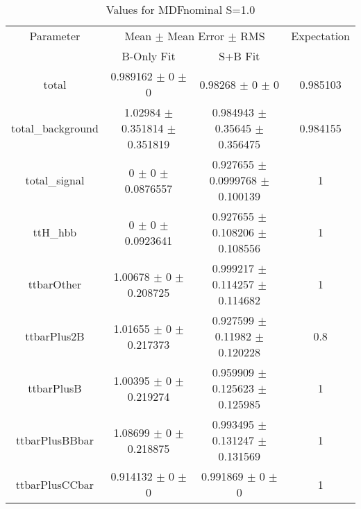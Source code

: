 \begin{table}
\centering
\caption{Values for MDFnominal S=1.0}
\begin{tabular}{cccc}
\toprule
Parameter & \multicolumn{2}{c}{Mean $\pm$ Mean Error $\pm$ RMS} & Expectation\\
 & B-Only Fit & S+B Fit & \\
\midrule
total & \num{0.989162} $\pm$ \num{0} $\pm$ \num{0} & \num{0.98268} $\pm$ \num{0} $\pm$ \num{0} & \num{0.985103}\\
total\_background & \num{1.02984} $\pm$ \num{0.351814} $\pm$ \num{0.351819} & \num{0.984943} $\pm$ \num{0.35645} $\pm$ \num{0.356475} & \num{0.984155}\\
total\_signal & \num{0} $\pm$ \num{0} $\pm$ \num{0.0876557} & \num{0.927655} $\pm$ \num{0.0999768} $\pm$ \num{0.100139} & \num{1}\\
ttH\_hbb & \num{0} $\pm$ \num{0} $\pm$ \num{0.0923641} & \num{0.927655} $\pm$ \num{0.108206} $\pm$ \num{0.108556} & \num{1}\\
ttbarOther & \num{1.00678} $\pm$ \num{0} $\pm$ \num{0.208725} & \num{0.999217} $\pm$ \num{0.114257} $\pm$ \num{0.114682} & \num{1}\\
ttbarPlus2B & \num{1.01655} $\pm$ \num{0} $\pm$ \num{0.217373} & \num{0.927599} $\pm$ \num{0.11982} $\pm$ \num{0.120228} & \num{0.8}\\
ttbarPlusB & \num{1.00395} $\pm$ \num{0} $\pm$ \num{0.219274} & \num{0.959909} $\pm$ \num{0.125623} $\pm$ \num{0.125985} & \num{1}\\
ttbarPlusBBbar & \num{1.08699} $\pm$ \num{0} $\pm$ \num{0.218875} & \num{0.993495} $\pm$ \num{0.131247} $\pm$ \num{0.131569} & \num{1}\\
ttbarPlusCCbar & \num{0.914132} $\pm$ \num{0} $\pm$ \num{0} & \num{0.991869} $\pm$ \num{0} $\pm$ \num{0} & \num{1}\\
\bottomrule
\end{tabular}
\end{table}